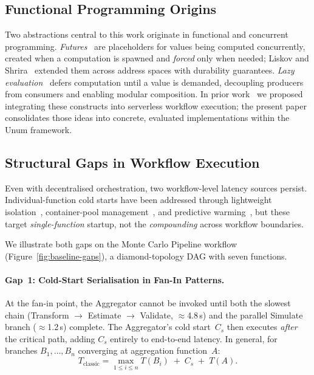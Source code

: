 \documentclass[runningheads]{llncs}
\begin{document}
\subsection{Functional Programming Origins}
\label{sec:fp-origins}

Two abstractions central to this work originate in functional and concurrent programming. \emph{Futures}~\cite{baker1977incremental,halstead1985multilisp} are placeholders for values being computed concurrently, created when a computation is spawned and \emph{forced} only when needed; Liskov and Shrira~\cite{liskov1988promises} extended them across address spaces with durability guarantees. \emph{Lazy evaluation}~\cite{hughes1989why} defers computation until a value is demanded, decoupling producers from consumers and enabling modular composition. In prior work~\cite{foldvari2025closer} we proposed integrating these constructs into serverless workflow execution; the present paper consolidates those ideas into concrete, evaluated implementations within the Unum framework.

\subsection{Structural Gaps in Workflow Execution}
\label{sec:gaps}

Even with decentralised orchestration, two workflow-level latency sources persist. Individual-function cold starts have been addressed through lightweight isolation~\cite{agache2020firecracker,du2020catalyzer}, container-pool management~\cite{fuerst2021faascache,lin2019mitigatingcoldstartsserverless}, and predictive warming~\cite{vahidinia2023rl}, but these target \emph{single-function} startup, not the \emph{compounding} across workflow boundaries.

We illustrate both gaps on the Monte Carlo Pipeline workflow (Figure~\ref{fig:baseline-gaps}), a diamond-topology DAG with seven functions.

\paragraph{Gap~1: Cold-Start Serialisation in Fan-In Patterns.}
At the fan-in point, the Aggregator cannot be invoked until both the slowest chain (Transform $\rightarrow$ Estimate $\rightarrow$ Validate, $\approx$4.8\,s) and the parallel Simulate branch ($\approx$1.2\,s) complete. The Aggregator's cold start~$C_s$ then executes \emph{after} the critical path, adding $C_s$ entirely to end-to-end latency. In general, for branches $B_1,\dots,B_n$ converging at aggregation function~$A$:
\begin{equation}
T_{\text{classic}} = \max_{1 \le i \le n} T(B_i) \;+\; C_s \;+\; T(A).
\label{eq:classic}
\end{equation}
\end{document}
